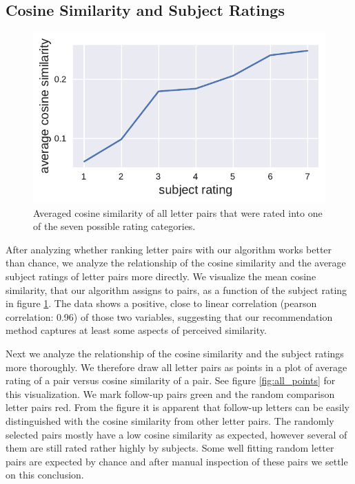 \justifying


\subsection*{Cosine Similarity and Subject Ratings}


\begin{figure}
	\begin{center}
		\includegraphics[width=0.98\linewidth]{figures/rating_vs_sim_mean}
	\end{center}
	\caption{Averaged cosine similarity of all letter pairs that were rated into one of the seven possible rating categories.}
	\label{fig:rating_vs_sim}
\end{figure} 
After analyzing whether ranking letter pairs with our algorithm works better than chance, we analyze the relationship of the cosine similarity and the average subject ratings of letter pairs more directly. We visualize the mean cosine similarity, that our algorithm assigns to pairs, as a function of the subject rating in figure \ref{fig:rating_vs_sim}. The data shows a positive, close to linear correlation (pearson correlation: 0.96) of those two variables, suggesting that our recommendation method captures at least some aspects of perceived similarity.

%	
%		
Next we analyze the relationship of the cosine similarity and the subject ratings more thoroughly. We therefore draw all letter pairs as points in a plot of average rating of a pair versus cosine similarity of a pair. See figure \ref{fig:all_points} for this visualization. We mark follow-up pairs green and the random comparison letter pairs red. From the figure it is apparent that follow-up letters can be easily distinguished with the cosine similarity from other letter pairs. The randomly selected pairs mostly have a low cosine similarity as expected, however several of them are still rated rather highly by subjects. Some well fitting random letter pairs are expected by chance and after manual inspection of these pairs we settle on this conclusion.





